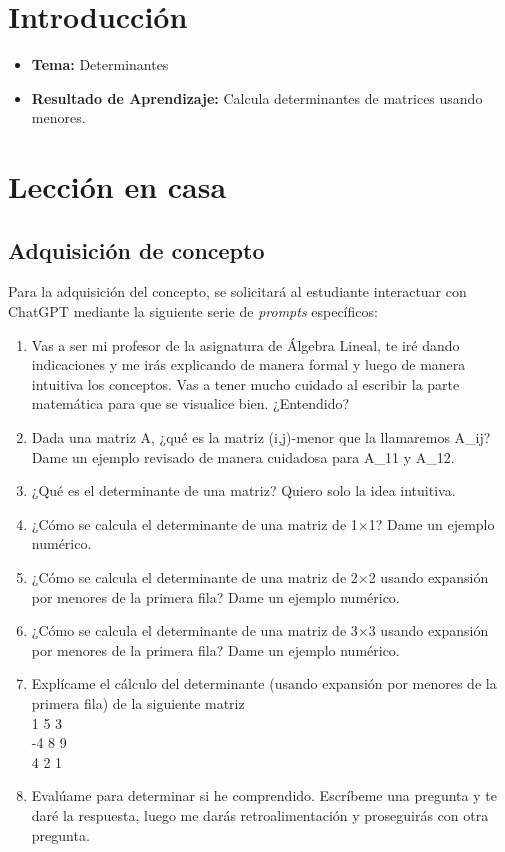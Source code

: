 \documentclass[a4,11pt]{aleph-notas}
\begin{document}
\encabezado

\vspace*{-10mm}
\section*{Introducción}

\begin{itemize}
    \item \textbf{Tema:} Determinantes
    \item \textbf{Resultado de Aprendizaje:} Calcula determinantes de matrices usando menores.
\end{itemize}

\section{Lección en casa}

\subsection{Adquisición de concepto}

Para la adquisición del concepto, se solicitará al estudiante interactuar con ChatGPT mediante la siguiente serie de \textit{prompts} específicos:

\begin{enumerate}[label=\textit{Prompt \arabic*.},leftmargin=2.1cm]
    \item Vas a ser mi profesor de la asignatura de Álgebra Lineal, te iré dando indicaciones y me irás explicando de manera formal y luego de manera intuitiva los conceptos. Vas a tener mucho cuidado al escribir la parte matemática para que se visualice bien. ¿Entendido?
    \item Dada una matriz A, ¿qué es la matriz (i,j)-menor que la llamaremos A\_ij? Dame un ejemplo revisado de manera cuidadosa para A\_11 y A\_12.
    \item ¿Qué es el determinante de una matriz? Quiero solo la idea intuitiva.
    \item ¿Cómo se calcula el determinante de una matriz de 1$\times$1? Dame un ejemplo numérico.
    \item ¿Cómo se calcula el determinante de una matriz de 2$\times$2 usando expansión por menores de la primera fila? Dame un ejemplo numérico.
    \item ¿Cómo se calcula el determinante de una matriz de 3$\times$3 usando expansión por menores de la primera fila? Dame un ejemplo numérico.
    \item Explícame el cálculo del determinante (usando expansión por menores de la primera fila) de la siguiente matriz\\
    1 5 3\\
    -4 8 9\\
    4 2 1
    \item Evalúame para determinar si he comprendido. Escríbeme una pregunta y te daré la respuesta, luego me darás retroalimentación y proseguirás con otra pregunta.
\end{enumerate}
\end{document}

